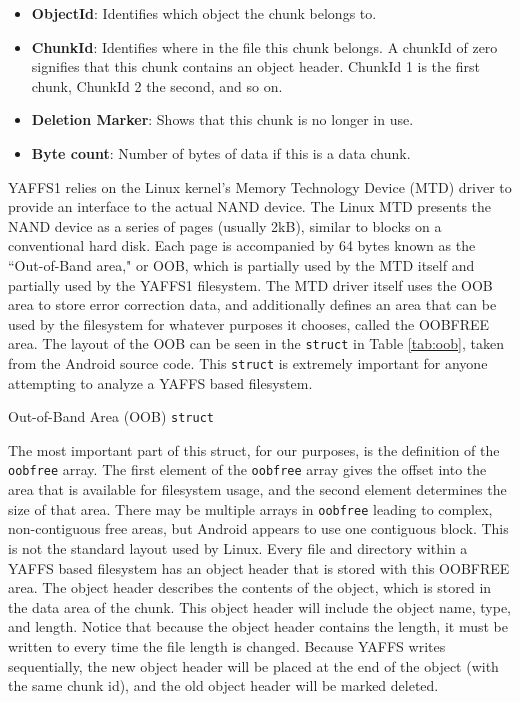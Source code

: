 \begin{itemize}
	\item {\bf ObjectId}: Identifies which object the chunk belongs to.\
	\item {\bf ChunkId}: Identifies where in the file this chunk belongs. 
		A chunkId of zero signifies that this chunk contains an object header. 
		ChunkId 1 is the first chunk, ChunkId 2 the second, and so on.
	\item {\bf Deletion Marker}: Shows that this chunk is no longer in use.
	\item {\bf Byte count}: Number of bytes of data if this is a data chunk.
\end{itemize}
\cite{howyaffsworks}

YAFFS1 relies on the Linux kernel's Memory Technology Device (MTD) driver to provide an interface to the actual NAND device.  The
Linux MTD presents the NAND device as a series of pages (usually 2kB), similar to blocks on a conventional hard disk.  Each page is
accompanied by 64 bytes known as the ``Out-of-Band area," or OOB, which is partially used by the MTD itself and partially used by
the YAFFS1 filesystem. The MTD driver itself uses the OOB area to store error correction data, and additionally defines an area that
can be used by the filesystem for whatever purposes it chooses, called the OOBFREE area.  The layout of the OOB can be seen in the
\texttt{struct} in Table \ref{tab:oob}, taken from the Android source code. This \texttt{struct} is extremely important for anyone
attempting to analyze a YAFFS based filesystem.

\begin{table}[htpb]

\caption{Out-of-Band Area (OOB) \texttt{struct}}
\label{tab:oob}
\end{table}

The most important part of this struct, for our purposes, is the definition of the \texttt{oobfree} array.  The first element of the
\texttt{oobfree} array gives the offset into the area that is available for filesystem usage, and the second element determines the
size of that area.  There may be multiple arrays in \texttt{oobfree} leading to complex, non-contiguous free areas, but Android
appears to use one contiguous block.  This is not the standard layout used by Linux. Every file and directory within a YAFFS based
filesystem has an object header that is stored with this OOBFREE area. The object header describes the contents of the object, which
is stored in the data area of the chunk. This object header will include the object name, type, and length.  Notice that because the
object header contains the length, it must be written to every time the file length is changed.  Because YAFFS writes sequentially,
the new object header will be placed at the end of the object (with the same chunk id), and the old object header will be marked
deleted. 

